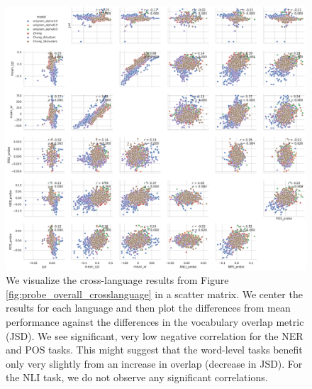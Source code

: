\begin{figure}[H]
    \centering
    \includegraphics[width=\textwidth]{figures/probe_detailed_crosslanguage_scattermatrix.pdf}
    \caption{We visualize the cross-language results from Figure \ref{fig:probe_overall_crosslanguage} in a scatter matrix. We center the results for each language and then plot the differences from mean performance against the differences in the vocabulary overlap metric (JSD). We see significant, very low negative correlation for the NER and POS tasks. This might suggest that the word-level tasks benefit only very slightly from an increase in overlap (decrease in JSD). For the NLI task, we do not observe any significant correlations.}
    \label{fig:probe_overall_crosslanguage_scattermatrix}
\end{figure}



